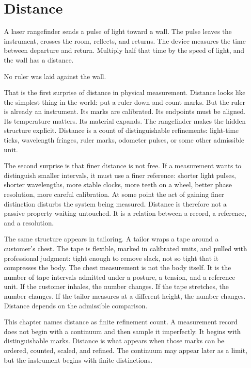 \chapter{Distance}
\label{chap:distance}


\begin{chapteressay}

A laser rangefinder sends a pulse of light toward a wall. The pulse leaves the
instrument, crosses the room, reflects, and returns. The device measures the
time between departure and return. Multiply half that time by the speed of
light, and the wall has a distance.

No ruler was laid against the wall.

That is the first surprise of distance in physical measurement. Distance looks
like the simplest thing in the world: put a ruler down and count marks. But the
ruler is already an instrument. Its marks are calibrated. Its endpoints must be
aligned. Its temperature matters. Its material expands. The rangefinder makes
the hidden structure explicit. Distance is a count of distinguishable
refinements: light-time ticks, wavelength fringes, ruler marks, odometer pulses,
or some other admissible unit.

The second surprise is that finer distance is not free. If a measurement wants
to distinguish smaller intervals, it must use a finer reference: shorter light
pulses, shorter wavelengths, more stable clocks, more teeth on a wheel, better
phase resolution, more careful calibration. At some point the act of gaining
finer distinction disturbs the system being measured. Distance is therefore not
a passive property waiting untouched. It is a relation between a record, a
reference, and a resolution.

The same structure appears in tailoring. A tailor wraps a tape around a
customer's chest. The tape is flexible, marked in calibrated units, and pulled
with professional judgment: tight enough to remove slack, not so tight that it
compresses the body. The chest measurement is not the body itself. It is the
number of tape intervals admitted under a posture, a tension, and a reference
unit. If the customer inhales, the number changes. If the tape stretches, the
number changes. If the tailor measures at a different height, the number
changes. Distance depends on the admissible comparison.

This chapter names distance as finite refinement count. A measurement record
does not begin with a continuum and then sample it imperfectly. It begins with
distinguishable marks. Distance is what appears when those marks can be ordered,
counted, scaled, and refined. The continuum may appear later as a limit, but the
instrument begins with finite distinctions.


\end{chapteressay}
